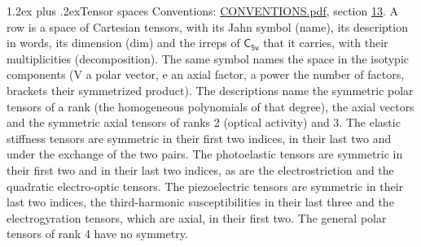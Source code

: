 \documentclass[10pt,a4paper]{article}
\makeatletter
\renewcommand\section{\@startsection{section}{1}{\z@}{-3ex plus -1ex minus -.2ex}%
  {1.2ex plus .2ex}{\normalfont\large\sffamily\bfseries\color{parttitle}}}
\numberwithin{equation}{section}
\newcommand{\grp}[1]{\mathsf{#1}}
\makeatother
\begin{document}
\section{Tensor spaces}\label{s:tensor_spaces}
Conventions: \href{../../CONVENTIONS.pdf}{CONVENTIONS.pdf}, section \href{../../CONVENTIONS.pdf\#conv.13}{13}.
\leavevmode\label{n:head.name}\label{n:head.description}\label{n:head.dim}\label{n:head.decomposition}A row is a space of Cartesian tensors, with its Jahn symbol (name), its description in words, its dimension (dim) and the irreps of $\grp{C_{5v}}$ that it carries, with their multiplicities (decomposition). \label{n:label.jahn}The same symbol names the space in the isotypic components (V a polar vector, e an axial factor, a power the number of factors, brackets their symmetrized product). The descriptions name the symmetric polar tensors of a rank (the homogeneous polynomials of that degree), the axial vectors and the symmetric axial tensors of ranks 2 (optical activity) and 3. The elastic stiffness tensors are symmetric in their first two indices, in their last two and under the exchange of the two pairs. The photoelastic tensors are symmetric in their first two and in their last two indices, as are the electrostriction and the quadratic electro-optic tensors. The piezoelectric tensors are symmetric in their last two indices, the third-harmonic susceptibilities in their last three and the electrogyration tensors, which are axial, in their first two. The general polar tensors of rank 4 have no symmetry.
\end{document}

